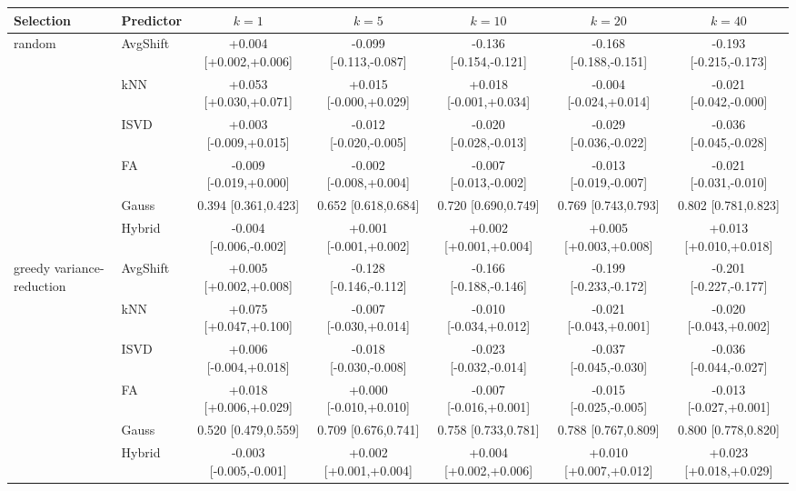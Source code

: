 \begin{tabular}{llccccc}\toprule
Selection & Predictor & $k{=}1$ & $k{=}5$ & $k{=}10$ & $k{=}20$ & $k{=}40$ \\\midrule
random & AvgShift & +0.004 [+0.002,+0.006] & -0.099 [-0.113,-0.087] & -0.136 [-0.154,-0.121] & -0.168 [-0.188,-0.151] & -0.193 [-0.215,-0.173] \\
 & kNN & +0.053 [+0.030,+0.071] & +0.015 [-0.000,+0.029] & +0.018 [-0.001,+0.034] & -0.004 [-0.024,+0.014] & -0.021 [-0.042,-0.000] \\
 & ISVD & +0.003 [-0.009,+0.015] & -0.012 [-0.020,-0.005] & -0.020 [-0.028,-0.013] & -0.029 [-0.036,-0.022] & -0.036 [-0.045,-0.028] \\
 & FA & -0.009 [-0.019,+0.000] & -0.002 [-0.008,+0.004] & -0.007 [-0.013,-0.002] & -0.013 [-0.019,-0.007] & -0.021 [-0.031,-0.010] \\
 & Gauss & 0.394 [0.361,0.423] & 0.652 [0.618,0.684] & 0.720 [0.690,0.749] & 0.769 [0.743,0.793] & 0.802 [0.781,0.823] \\
 & Hybrid & -0.004 [-0.006,-0.002] & +0.001 [-0.001,+0.002] & +0.002 [+0.001,+0.004] & +0.005 [+0.003,+0.008] & +0.013 [+0.010,+0.018] \\
\midrule
greedy variance-reduction & AvgShift & +0.005 [+0.002,+0.008] & -0.128 [-0.146,-0.112] & -0.166 [-0.188,-0.146] & -0.199 [-0.233,-0.172] & -0.201 [-0.227,-0.177] \\
 & kNN & +0.075 [+0.047,+0.100] & -0.007 [-0.030,+0.014] & -0.010 [-0.034,+0.012] & -0.021 [-0.043,+0.001] & -0.020 [-0.043,+0.002] \\
 & ISVD & +0.006 [-0.004,+0.018] & -0.018 [-0.030,-0.008] & -0.023 [-0.032,-0.014] & -0.037 [-0.045,-0.030] & -0.036 [-0.044,-0.027] \\
 & FA & +0.018 [+0.006,+0.029] & +0.000 [-0.010,+0.010] & -0.007 [-0.016,+0.001] & -0.015 [-0.025,-0.005] & -0.013 [-0.027,+0.001] \\
 & Gauss & 0.520 [0.479,0.559] & 0.709 [0.676,0.741] & 0.758 [0.733,0.781] & 0.788 [0.767,0.809] & 0.800 [0.778,0.820] \\
 & Hybrid & -0.003 [-0.005,-0.001] & +0.002 [+0.001,+0.004] & +0.004 [+0.002,+0.006] & +0.010 [+0.007,+0.012] & +0.023 [+0.018,+0.029] \\
\bottomrule
\end{tabular}
